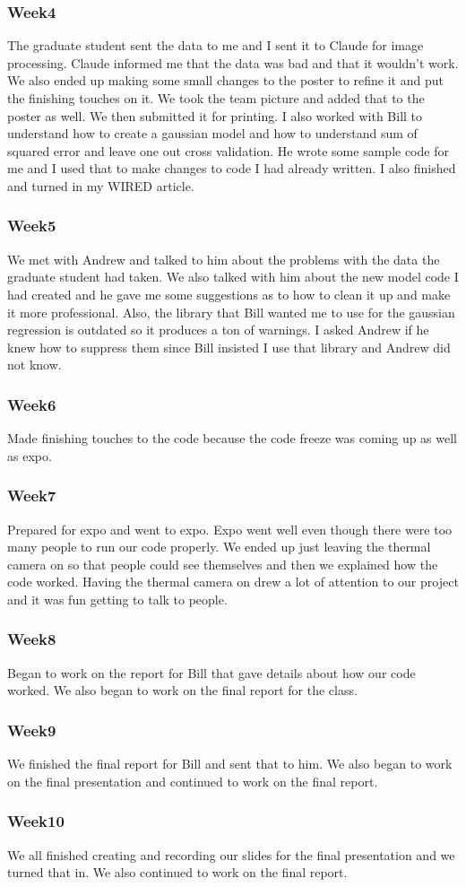 \subsubsection*{Week4}
The graduate student sent the data to me and I sent it to Claude for image processing. Claude informed me that the data was bad and that it wouldn't work. We also ended up making some small changes to the poster to refine it and put the finishing touches on it. We took the team picture and added that to the poster as well. We then submitted it for printing. I also worked with Bill to understand how to create a gaussian model and how to understand sum of squared error and leave one out cross validation. He wrote some sample code for me and I used that to make changes to code I had already written. I also finished and turned in my WIRED article.
\subsubsection*{Week5}
We met with Andrew and talked to him about the problems with the data the graduate student had taken. We also talked with him about the new model code I had created and he gave me some suggestions as to how to clean it up and make it more professional. Also, the library that Bill wanted me to use for the gaussian regression is outdated so it produces a ton of warnings. I asked Andrew if he knew how to suppress them since Bill insisted I use that library and Andrew did not know. 
\subsubsection*{Week6}
Made finishing touches to the code because the code freeze was coming up as well as expo. 
\subsubsection*{Week7}
Prepared for expo and went to expo. Expo went well even though there were too many people to run our code properly. We ended up just leaving the thermal camera on so that people could see themselves and then we explained how the code worked. Having the thermal camera on drew a lot of attention to our project and it was fun getting to talk to people. 
\subsubsection*{Week8}
Began to work on the report for Bill that gave details about how our code worked. We also began to work on the final report for the class.  
\subsubsection*{Week9}
We finished the final report for Bill and sent that to him. We  also began to work on the final presentation and continued to work on the final report.
\subsubsection*{Week10}
We all finished creating and recording our slides for the final presentation and we turned that in. We also continued to work on the final report. 
